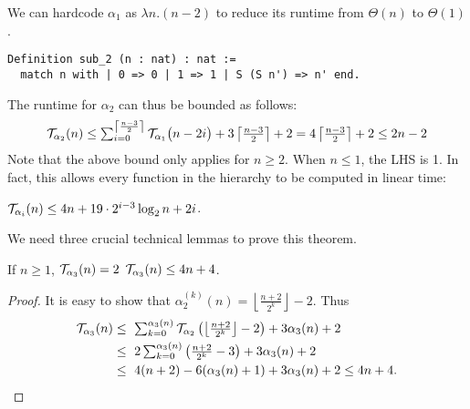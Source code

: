 We can hardcode $\alpha_1$ as $\lambda n.(n-2)$ to reduce its runtime
from $\Theta(n)$ to $\Theta(1)$.
\begin{lstlisting}
Definition sub_2 (n : nat) : nat :=
  match n with | 0 => 0 | 1 => 1 | S (S n') => n' end.
\end{lstlisting}
The runtime for $\alpha_2$ can thus be bounded as follows:
\begin{equation*}
\mathcal{T}_{\alpha_2}(n)
 \le \textstyle \sum_{i=0}^{\left\lceil \frac{n-3}{2} \right\rceil} \mathcal{T}_{\alpha_1}\big(n-2i\big) + 3\left\lceil \frac{n-3}{2} \right\rceil + 2  =  4\left\lceil \frac{n-3}{2} \right\rceil + 2
 \le 2n - 2
\end{equation*}
Note that the above bound only applies for $n\ge 2$. When $n\le 1$, the LHS is 1. In fact, this allows every function in the hierarchy to be computed in linear time:
\begin{thm} \label{thm: inv-ack-hier-runtime-improved}
	$\mathcal{T}_{\alpha_i}(n) \le 4n + 19\cdot 2^{i-3}\log_2n + 2i$.
\end{thm}
We need three crucial technical lemmas to prove this theorem.
\begin{lem} \label{lem: inv-ack-3-runtime}
	If $n\ge 1$, $\mathcal{T}_{\alpha_3}(n) = 2$ $\mathcal{T}_{\alpha_3}(n) \le 4n + 4$.
\end{lem}
\begin{proof}
	It is easy to show that $\alpha_2^{(k)}(n) = \left\lfloor \frac{n+2}{2^k} \right\rfloor - 2$. Thus
	\begin{equation*}
	\begin{aligned}
		\runtime_{\alpha_3}(n)
		& \textstyle \le \ \sum_{k=0}^{\alpha_{3}(n)}\runtime_{\alpha_2}\left(\left\lfloor \frac{n+2}{2^k} \right\rfloor - 2\right) + 3\alpha_{3}(n) + 2 \\
		& \textstyle \le \ 2\sum_{k=0}^{\alpha_3(n)}\left(\frac{n+2}{2^k} - 3\right) + 3\alpha_3(n) + 2 \\
		& \le \ 4(n + 2) - 6(\alpha_3(n) + 1) + 3\alpha_3(n) + 2 \le 4n + 4.
	\end{aligned}
\end{equation*}
\end{proof}
